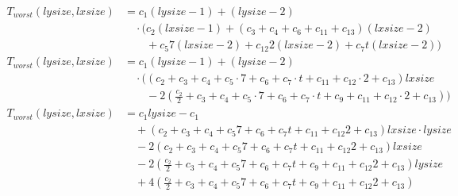 \begin{subequations}
\label{eq:analyse-arlabeling-regionlabeling-2}
\begin{align}
\label{eq:analyse-arlabeling-regionlabeling-2-1}
T_{worst}(\mathit{lysize},\mathit{lxsize})& = c_{1}(\mathit{lysize} - 1) + (\mathit{lysize} - 2)
 \\
& \quad \cdot \bigl(c_2(\mathit{lxsize} - 1) + (c_{3} + c_{4} + c_{6} + c_{11} + c_{13})(\mathit{lxsize} - 2)
 \nonumber \\
& \quad \quad + c_{5}7(\mathit{lxsize} - 2) + c_{12}2(\mathit{lxsize} - 2) + c_{7}t(\mathit{lxsize} - 2) \bigr) 
 \nonumber \\
\label{eq:analyse-arlabeling-regionlabeling-2-2}
T_{worst}(\mathit{lysize},\mathit{lxsize})& = c_{1}(\mathit{lysize} - 1) + (\mathit{lysize} - 2) \\
& \quad \cdot \bigl((c_{2} + c_{3} + c_{4} + c_{5} \cdot 7 + c_{6} + c_{7} \cdot t + c_{11} + c_{12} \cdot 2 + c_{13})\mathit{lxsize} \nonumber \\
& \quad \quad - 2(\frac{c_2}{2} + c_{3} + c_{4} + c_{5} \cdot 7 + c_{6} + c_{7} \cdot t + c_{9} + c_{11} + c_{12} \cdot 2 + c_{13}) \bigr) \nonumber \\
\label{eq:analyse-arlabeling-regionlabeling-2-3}
T_{worst}(\mathit{lysize},\mathit{lxsize})& = c_{1}\mathit{lysize} - c_{1}
 \\
& \quad + (c_{2} + c_{3} + c_{4} + c_{5}7 + c_{6} + c_{7}t + c_{11} + c_{12}2 + c_{13})\mathit{lxsize}
 \cdot \mathit{lysize}
 \nonumber \\
& \quad -2(c_{2} + c_{3} + c_{4} + c_{5}7 + c_{6} + c_{7}t + c_{11} + c_{12}2 + c_{13})\mathit{lxsize}
 \nonumber \\
& \quad - 2(\frac{c_2}{2} + c_{3} + c_{4} + c_{5}7 + c_{6} + c_{7}t + c_{9} + c_{11} + c_{12}2 + c_{13})\mathit{lysize}
 \nonumber \\
& \quad + 4(\frac{c_2}{2} + c_{3} + c_{4} + c_{5}7 + c_{6} + c_{7}t + c_{9} + c_{11} + c_{12}2 + c_{13})
 \nonumber
\end{align}
\end{subequations}
